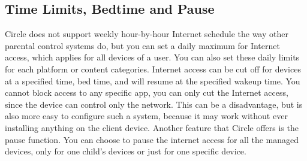 \subsection{Time Limits, Bedtime and Pause}

Circle does not support weekly hour-by-hour Internet schedule the way other parental control systems do, but you can set a daily maximum for Internet access, which applies for all devices of a user. You can also set these daily limits for each platform or content categories. Internet access can be cut off for devices at a specified time, bed time, and will resume at the specified wakeup time. You cannot block access to any specific app, you can only cut the Internet access, since the device can control only the network. This can be a disadvantage, but is also more easy to configure such a system, because it may work without ever installing anything on the client device. Another feature that Circle offers is the pause function. You can choose to pause the internet access for all the managed devices, only for one child's devices or just for one specific device.

